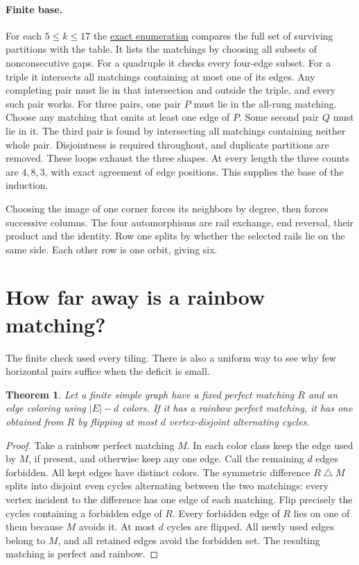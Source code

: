 \documentclass[11pt]{article}
\newtheorem{theorem}{Theorem}
\newcommand{\repo}{https://github.com/Akhil-rav/discrete-math-lab}
\begin{document}
\paragraph{Finite base.}
For each \(5\le k\le17\) the
\href{\repo/blob/main/experiments/ladder_stability.py}{exact enumeration}
compares the full set of surviving partitions with the table. It lists the
matchings by choosing all subsets of nonconsecutive gaps. For a quadruple
it checks every four-edge subset. For a triple it intersects all matchings
containing at most one of its edges. Any completing pair must lie in that
intersection and outside the triple, and every such pair works. For three
pairs, one pair \(P\) must lie in the all-rung matching. Choose any matching
that omits at least one edge of \(P\). Some second pair \(Q\) must lie in it.
The third pair is found by intersecting all matchings containing neither
whole pair. Disjointness is required throughout, and duplicate partitions
are removed. These loops exhaust the three shapes. At every length the
three counts are \(4,8,3\), with exact agreement of edge positions.
This supplies the base of the induction.

Choosing the image of one corner forces its neighbors by degree, then
forces successive columns. The four automorphisms are rail exchange, end
reversal, their product and the identity. Row one splits by whether the
selected rails lie on the same side. Each other row is one orbit, giving six.

\newpage
\section{How far away is a rainbow matching?}
The finite check used every tiling. There is also a uniform way to see why
few horizontal pairs suffice when the deficit is small.

\begin{theorem}
Let a finite simple graph have a fixed perfect matching \(R\) and an edge
coloring using \(|E|-d\) colors. If it has a rainbow
perfect matching, it has one obtained from \(R\) by flipping at most \(d\)
vertex-disjoint alternating cycles.
\end{theorem}
\begin{proof}
Take a rainbow perfect matching \(M\). In each color class keep
the edge used by \(M\), if present, and otherwise keep any one edge. Call
the remaining \(d\) edges forbidden. All kept edges have distinct colors.
The symmetric difference \(R\mathbin{\triangle}M\) splits into disjoint
even cycles alternating between the two matchings: every vertex incident
to the difference has one edge of each matching. Flip precisely the cycles
containing a forbidden edge of \(R\). Every forbidden edge of \(R\) lies on
one of them because \(M\) avoids it. At most \(d\) cycles are flipped.
All newly used edges belong to \(M\), and all retained edges avoid the
forbidden set. The resulting matching is perfect and rainbow.
\end{proof}
\end{document}
